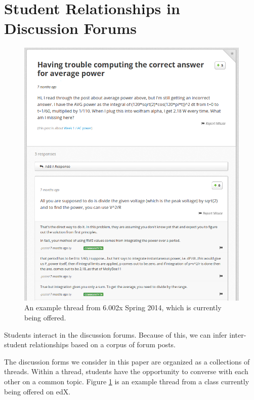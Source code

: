 \section{Student Relationships in Discussion Forums}

\begin{figure}
  \begin{center}
    \includegraphics[width=1\linewidth]{forum_example.png}
    \caption{An example thread from 6.002x Spring 2014, which is currently being offered.}
    \label{forum}
  \end{center}
\end{figure}

Students interact in the discussion forums. Because of this, we can infer inter-student relationships based on a corpus of forum posts. 

The discussion forms we consider in this paper are organized as a collections of threads. Within a thread, students have the opportunity to converse with each other on a common topic. Figure \ref{forum} is an example thread from a class currently being offered on edX.

